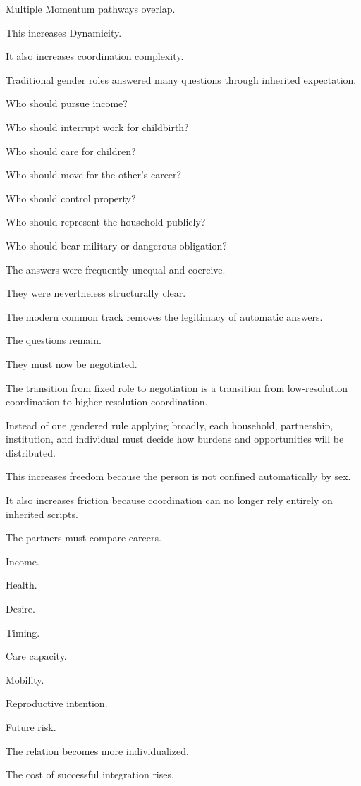 Multiple Momentum pathways overlap.

This increases Dynamicity.

It also increases coordination complexity.

Traditional gender roles answered many questions through inherited expectation.

Who should pursue income?

Who should interrupt work for childbirth?

Who should care for children?

Who should move for the other’s career?

Who should control property?

Who should represent the household publicly?

Who should bear military or dangerous obligation?

The answers were frequently unequal and coercive.

They were nevertheless structurally clear.

The modern common track removes the legitimacy of automatic answers.

The questions remain.

They must now be negotiated.

The transition from fixed role to negotiation is a transition from low-resolution coordination to higher-resolution coordination.

Instead of one gendered rule applying broadly, each household, partnership, institution, and individual must decide how burdens and opportunities will be distributed.

This increases freedom because the person is not confined automatically by sex.

It also increases friction because coordination can no longer rely entirely on inherited scripts.

The partners must compare careers.

Income.

Health.

Desire.

Timing.

Care capacity.

Mobility.

Reproductive intention.

Future risk.

The relation becomes more individualized.

The cost of successful integration rises.

